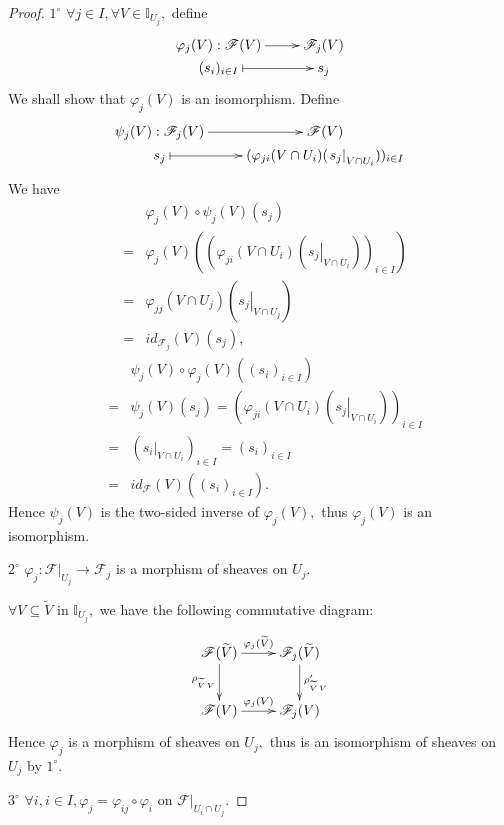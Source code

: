 \begin{proof}
$\mathit{1^{\circ}}$ $\forall j\in I,\forall V\in\mathds{I}_{U_j},$
define
\[ \xymatrix@R=0em{
   {\varphi_j(V):\mathscr{F}(V)} \ar[r] & {\mathscr{F}_j(V)} \\
   {(s_i)_{i\in I}} \ar@{|->}[r] & s_j }  \]
We shall show that $\varphi_j(V)$ is an isomorphism. Define
\[ \xymatrix@R=0em{
   {\psi_j(V):\mathscr{F}_j(V)} \ar[r] & {\mathscr{F}(V)} \\
   s_j \ar@{|->}[r] &
   {(\varphi_{ji}(V\cap U_i)(\left.s_j\right|_{V \cap U_i}))_{i\in I}} }
\]
We have
\begin{eqnarray*}
& & \varphi_j(V)\circ\psi_j(V)(s_j) \\
& = & \varphi_j(V)((\varphi_{ji}(V\cap U_i)(\left.s_j\right|_{V \cap
U_i}))_{i\in
I})                                                             \\
& = & \varphi_{jj}(V\cap U_j)(\left.s_j\right|_{V \cap U_j})    \\
& = & id_{\mathscr{F}_j}(V)(s_j),
\end{eqnarray*}
\begin{eqnarray*}
& & \psi_j(V)\circ\varphi_j(V)((s_i)_{i\in I}) \\
& = & \psi_j(V)(s_j) =
(\varphi_{ji}(V\cap U_i)(\left.s_j\right|_{V \cap U_i}))_{i\in I} \\
& = & (\left.s_i\right|_{V \cap U_i})_{i\in I}=(s_i)_{i\in I}   \\
& = & id_{\mathscr{F}}(V)((s_i)_{i\in I}).
\end{eqnarray*}
Hence $\psi_j(V)$ is the two-sided inverse of $\varphi_j(V),$ thus
$\varphi_j(V)$ is an isomorphism.

$\mathit{2^{\circ}}$ $\varphi_j:
\left.\mathscr{F}\right|_{U_j}\rightarrow \mathscr{F}_j$ is a
morphism of sheaves on $U_j.$

$\forall V\subseteq \widetilde{V}$ in $\mathds{I}_{U_j},$ we have
the following commutative diagram:
\[ \xymatrix{
   {\mathscr{F}(\widetilde{V})} \ar[d]_-{\rho_{\widetilde{V}\,V}}
   \ar[r]^-{\varphi_j(\widetilde{V})} &
   {\mathscr{F}_j(\widetilde{V})}
   \ar[d]^-{\rho_{\widetilde{V}\,V}^{\prime}}                 \\
   {\mathscr{F}(V)} \ar[r]^-{\varphi_j(V)} & {\mathscr{F}_j(V)} }
\]
Hence $\varphi_j$ is a morphism of sheaves on $U_j,$ thus is an
isomorphism of sheaves on $U_j$ by $\mathit{1^{\circ}}.$

$\mathit{3^{\circ}}$ $\forall i,i\in I,
\varphi_j=\varphi_{ij}\circ\varphi_i$ on
$\left.\mathscr{F}\right|_{U_i\cap U_j}.$


\end{proof}
